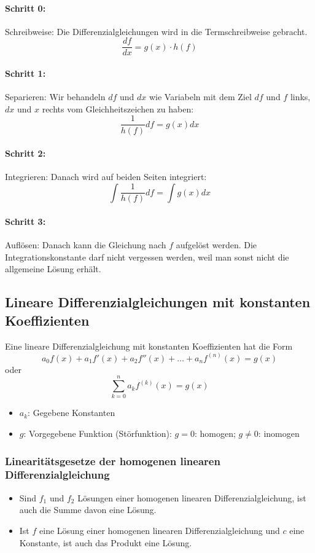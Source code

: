 \paragraph{Schritt 0:} Schreibweise: Die Differenzialgleichungen wird in
die Termschreibweise gebracht.
\[ \frac{df}{dx} = g(x) \cdot h(f) \]

\paragraph{Schritt 1:} Separieren: Wir behandeln $df$ und $dx$ wie Variabeln mit dem Ziel $df$ und $f$
links, $dx$ und $x$ rechts vom Gleichheitszeichen zu haben:
\[ \frac{1}{h(f)} df = g(x) dx \]

\paragraph{Schritt 2:} Integrieren: Danach wird auf beiden Seiten integriert:
\[ \int \frac{1}{h(f)} df = \int g(x) dx \]

\paragraph{Schritt 3:} Auflösen: Danach kann die Gleichung nach $f$
aufgelöst werden. Die Integrationskonstante darf nicht vergessen werden,
weil man sonst nicht die allgemeine Lösung erhält.

\subsection{Lineare Differenzialgleichungen mit konstanten Koeffizienten}
Eine lineare Differenzialgleichung mit konstanten Koeffizienten hat die Form
\[ a_{0}f(x) + a_{1}f'(x) + a_{2}f''(x) + \dots + a_{n}f^{(n)}(x) = g(x) \]
oder
\[ \sum_{k=0}^{n} a_{k}f^{(k)}(x) = g(x) \]
\begin{itemize}
  \item $a_k$: Gegebene Konstanten
  \item $g$: Vorgegebene Funktion (Störfunktion): $g = 0$: homogen; $g \ne 0$: inomogen
\end{itemize}

\subsubsection{Linearitätsgesetze der homogenen linearen Differenzialgleichung}
\begin{itemize}
  \item Sind $f_1$ und $f_2$ Lösungen einer homogenen linearen
    Differenzialgleichung, ist auch die Summe davon eine Lösung.
  \item Ist $f$ eine Lösung einer homogenen linearen
    Differenzialgleichung und $c$ eine Konstante, ist auch das Produkt
    eine Lösung.
\end{itemize}

